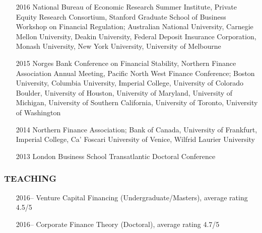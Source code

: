 \documentclass[11pt]{article}
\begin{document}
\begin{itemize}
    \item[2016] National Bureau of Economic Research Summer Institute, Private Equity Research Consortium, Stanford Graduate School of Business Workshop on Financial Regulation; Australian National University, Carnegie Mellon University, Deakin University, Federal Deposit Insurance Corporation, Monash University, New York University, University of Melbourne

    \item[2015] Norges Bank Conference on Financial Stability, Northern Finance Association Annual Meeting, Pacific North West Finance Conference; Boston University, Columbia University, Imperial College, University of Colorado Boulder, University of Houston, University of Maryland, University of Michigan, University of Southern California, University of Toronto, University of Washington

    \item[2014] Northern Finance Association; Bank of Canada, University of Frankfurt, Imperial College, Ca' Foscari University of Venice, Wilfrid Laurier University

    \item[2013] London Business School Transatlantic Doctoral Conference
\end{itemize}

\subsubsection*{TEACHING}
\begin{itemize}
    \item[2016--] Venture Capital Financing (Undergraduate/Masters), average rating 4.5/5
    \item[2016--] Corporate Finance Theory (Doctoral), average rating 4.7/5
\end{itemize}
\end{document}
